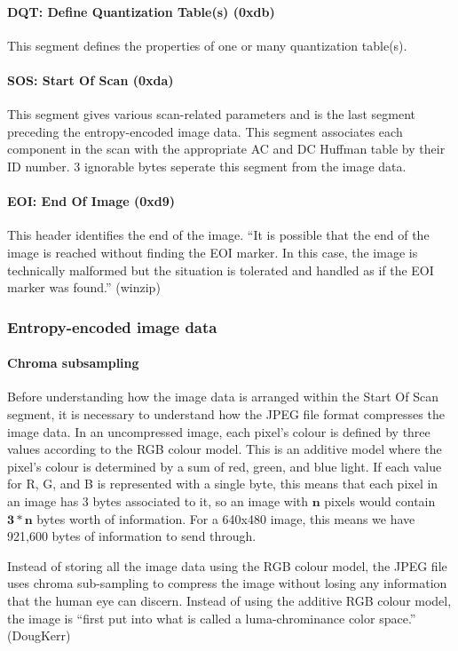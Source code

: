 \paragraph*{DQT: Define Quantization Table(s) (0xdb)}
This segment defines the properties of one or many quantization table(s).

\paragraph*{SOS: Start Of Scan (0xda)}
This segment gives various scan-related parameters and is the last segment preceding the entropy-encoded image data. 
This segment associates each component in the scan with the appropriate AC and DC Huffman table by their ID number. 
3 ignorable bytes seperate this segment from the image data. 

\paragraph*{EOI: End Of Image (0xd9)}
This header identifies the end of the image. ``It is possible that the end of the image is reached without finding the EOI marker. 
In this case, the image is technically malformed but the situation is tolerated and handled as if the EOI marker was found.'' (winzip) 

\subsubsection{Entropy-encoded image data}

\paragraph{Chroma subsampling}
Before understanding how the image data is arranged within the Start Of Scan segment, 
it is necessary to understand how the JPEG file format compresses the image data. 
In an uncompressed image, each pixel's colour is defined by three values according to the RGB colour model. 
This is an additive model where the pixel's colour is determined by a sum of red, green, and blue light. 
If each value for R, G, and B is represented with a single byte, this means that each pixel in an image has 3 bytes associated to it, so 
an image with $\mathbf{n}$ pixels would contain $\mathbf{3*n}$ bytes worth of information. 
For a 640x480 image, this means we have 921,600 bytes of information to send through.

Instead of storing all the image data using the RGB colour model, 
the JPEG file uses chroma sub-sampling to compress the image without losing any information that the human eye can discern. 
Instead of using the additive RGB colour model, the image is ``first put into what is called a luma-chrominance color space.'' (DougKerr)

